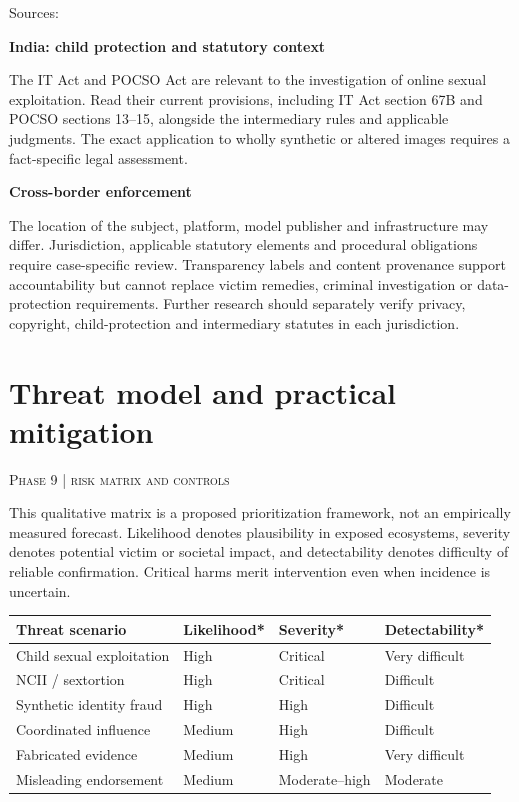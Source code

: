\documentclass[10pt,a4paper]{article}
\newcommand{\sect}[2]{\Needspace{6\baselineskip}\section{#1}\textcolor{muted}{\small\textsc{#2}}\par\vspace{2mm}}
\newcommand{\sub}[1]{\vspace{1mm}\textbf{#1}\par}
\begin{document}
Sources:  \cite{india,indiafaq,eu,eudate,us,uk,ukcps,au,ca,jp,kr,itact,pocso}


\sub{India: child protection and statutory context}

The IT Act and POCSO Act are relevant to the investigation of online sexual exploitation. Read their current provisions, including IT Act section 67B and POCSO sections 13--15, alongside the intermediary rules and applicable judgments. The exact application to wholly synthetic or altered images requires a fact-specific legal assessment. \cite{itact,pocso}


\sub{Cross-border enforcement}

The location of the subject, platform, model publisher and infrastructure may differ. Jurisdiction, applicable statutory elements and procedural obligations require case-specific review. Transparency labels and content provenance support accountability but cannot replace victim remedies, criminal investigation or data-protection requirements. Further research should separately verify privacy, copyright, child-protection and intermediary statutes in each jurisdiction.


\sect{Threat model and practical mitigation}{Phase 9 | risk matrix and controls}

This qualitative matrix is a proposed prioritization framework, not an empirically measured forecast. Likelihood denotes plausibility in exposed ecosystems, severity denotes potential victim or societal impact, and detectability denotes difficulty of reliable confirmation. Critical harms merit intervention even when incidence is uncertain.


\begin{center}\small\begin{tabularx}{\linewidth}{@{}YYYY@{}}\toprule
\textbf{Threat scenario} & \textbf{Likelihood*} & \textbf{Severity*} & \textbf{Detectability*}\\\midrule
Child sexual exploitation & High & Critical & Very difficult\\
NCII / sextortion & High & Critical & Difficult\\
Synthetic identity fraud & High & High & Difficult\\
Coordinated influence & Medium & High & Difficult\\
Fabricated evidence & Medium & High & Very difficult\\
Misleading endorsement & Medium & Moderate--high & Moderate\\\bottomrule\end{tabularx}\end{center}
\end{document}
